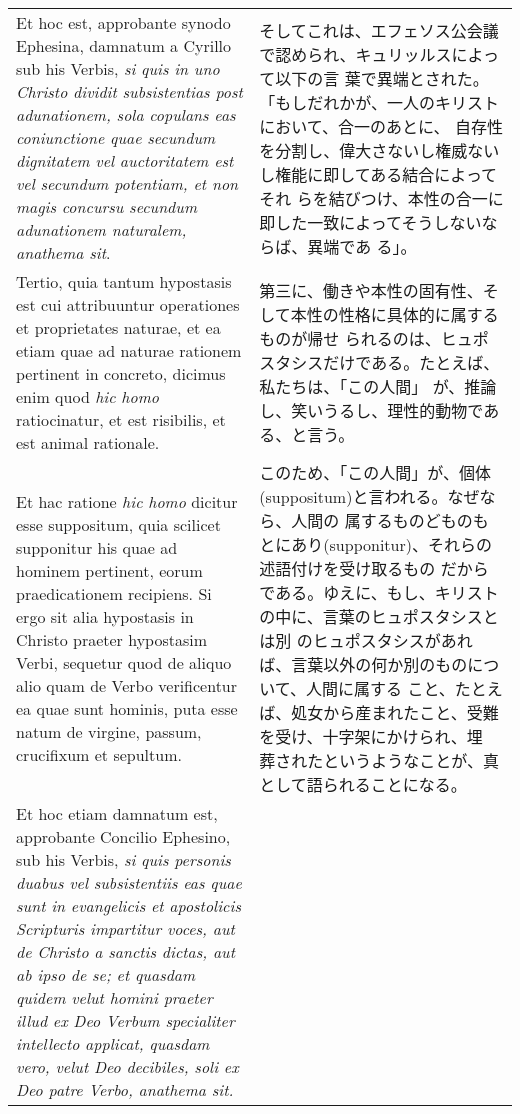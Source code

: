 \documentclass[10pt]{jsarticle} %
\begin{document}
\begin{longtable}{p{21em}p{21em}}
\\


Et hoc est, approbante synodo Ephesina, damnatum a Cyrillo sub his
Verbis, {\itshape si quis in uno Christo dividit subsistentias post
adunationem, sola copulans eas coniunctione quae secundum dignitatem
vel auctoritatem est vel secundum potentiam, et non magis concursu
secundum adunationem naturalem, anathema sit}.


&

そしてこれは、エフェソス公会議で認められ、キュリッルスによって以下の言
葉で異端とされた。「もしだれかが、一人のキリストにおいて、合一のあとに、
自存性を分割し、偉大さないし権威ないし権能に即してある結合によってそれ
らを結びつけ、本性の合一に即した一致によってそうしないならば、異端であ
る」。


\\


Tertio, quia tantum hypostasis est cui attribuuntur operationes et
proprietates naturae, et ea etiam quae ad naturae rationem pertinent
in concreto, dicimus enim quod {\itshape hic homo} ratiocinatur, et
est risibilis, et est animal rationale.


&

第三に、働きや本性の固有性、そして本性の性格に具体的に属するものが帰せ
られるのは、ヒュポスタシスだけである。たとえば、私たちは、「この人間」
が、推論し、笑いうるし、理性的動物である、と言う。

\\


Et hac ratione {\itshape hic homo} dicitur esse suppositum, quia
scilicet supponitur his quae ad hominem pertinent, eorum
praedicationem recipiens. Si ergo sit alia hypostasis in Christo
praeter hypostasim Verbi, sequetur quod de aliquo alio quam de Verbo
verificentur ea quae sunt hominis, puta esse natum de virgine, passum,
crucifixum et sepultum.


&

このため、「この人間」が、個体(suppositum)と言われる。なぜなら、人間の
属するものどものもとにあり(supponitur)、それらの述語付けを受け取るもの
だからである。ゆえに、もし、キリストの中に、言葉のヒュポスタシスとは別
のヒュポスタシスがあれば、言葉以外の何か別のものについて、人間に属する
こと、たとえば、処女から産まれたこと、受難を受け、十字架にかけられ、埋
葬されたというようなことが、真として語られることになる。

\\


Et hoc etiam damnatum est, approbante Concilio Ephesino, sub his
Verbis, {\itshape si quis personis duabus vel subsistentiis eas quae
sunt in evangelicis et apostolicis Scripturis impartitur voces, aut de
Christo a sanctis dictas, aut ab ipso de se; et quasdam quidem velut
homini praeter illud ex Deo Verbum specialiter intellecto applicat,
quasdam vero, velut Deo decibiles, soli ex Deo patre Verbo, anathema
sit. }



\end{longtable}
\end{document}
